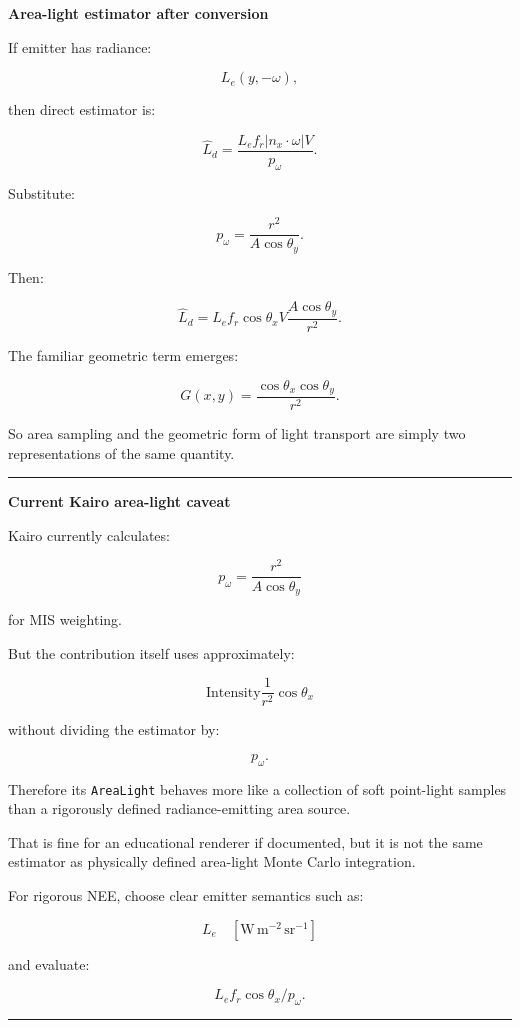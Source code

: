 \textbf{Area-light estimator after conversion}

If emitter has radiance:

\[
L_e(y,-\omega),
\]

then direct estimator is:

\[
\boxed{
\hat L_d
=
\frac{
L_e
f_r
|n_x\cdot\omega|
V
}{
p_\omega
}.
}
\]

Substitute:

\[
p_\omega
=
\frac{r^2}{A\cos\theta_y}.
\]

Then:

\[
\hat L_d
=
L_e
f_r
\cos\theta_x
V
\frac{
A\cos\theta_y
}{
r^2
}.
\]

The familiar geometric term emerges:

\[
\boxed{
G(x,y)
=
\frac{
\cos\theta_x\cos\theta_y
}{
r^2
}.
}
\]

So area sampling and the geometric form of light transport are simply two representations of the same quantity.

\begin{center}\rule{0.5\linewidth}{0.5pt}\end{center}

\textbf{Current Kairo area-light caveat}

Kairo currently calculates:

\[
p_\omega
=
\frac{r^2}{A\cos\theta_y}
\]

for MIS weighting.

But the contribution itself uses approximately:

\[
\text{Intensity}
\frac1{r^2}
\cos\theta_x
\]

without dividing the estimator by:

\[
p_\omega.
\]

Therefore its \texttt{AreaLight} behaves more like a collection of soft point-light samples than a rigorously defined radiance-emitting area source.

That is fine for an educational renderer if documented, but it is not the same estimator as physically defined area-light Monte Carlo integration.

For rigorous NEE, choose clear emitter semantics such as:

\[
L_e\quad[\mathrm{W\,m^{-2}\,sr^{-1}}]
\]

and evaluate:

\[
L_e f_r\cos\theta_x/p_\omega.
\]

\begin{center}\rule{0.5\linewidth}{0.5pt}\end{center}

